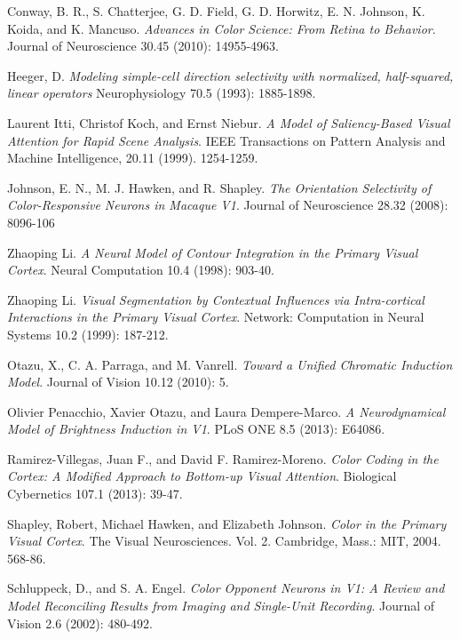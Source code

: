 \documentclass[journal,onecolumn]{IEEEtran}
\begin{document}
\begin{thebibliography}{1}

    Conway, B. R., S. Chatterjee, G. D. Field, G. D. Horwitz, E. N. Johnson, K. Koida, and K. Mancuso.
    \emph{Advances in Color Science: From Retina to Behavior}.
    Journal of Neuroscience 30.45 (2010): 14955-4963.

    Heeger, D.
    \emph{Modeling simple-cell direction selectivity with normalized, half-squared, linear operators}
    Neurophysiology 70.5 (1993): 1885-1898.

    Laurent Itti, Christof Koch, and Ernst Niebur.
    \emph{A Model of Saliency-Based Visual Attention for Rapid Scene Analysis}.
    IEEE Transactions on Pattern Analysis and Machine Intelligence, 20.11 (1999). 1254-1259.

    Johnson, E. N., M. J. Hawken, and R. Shapley.
    \emph{The Orientation Selectivity of Color-Responsive Neurons in Macaque V1}.
    Journal of Neuroscience 28.32 (2008): 8096-106

  Zhaoping Li.
  \emph{A Neural Model of Contour Integration in the Primary Visual Cortex}.
  Neural Computation 10.4 (1998): 903-40.

  Zhaoping Li.
  \emph{Visual Segmentation by Contextual Influences via Intra-cortical Interactions in the Primary Visual Cortex}.
  Network: Computation in Neural Systems 10.2 (1999): 187-212.

    Otazu, X., C. A. Parraga, and M. Vanrell.
    \emph{Toward a Unified Chromatic Induction Model}.
    Journal of Vision 10.12 (2010): 5.

    Olivier Penacchio, Xavier Otazu, and Laura Dempere-Marco.
    \emph{A Neurodynamical Model of Brightness Induction in V1}.
    PLoS ONE 8.5 (2013): E64086.

    Ramirez-Villegas, Juan F., and David F. Ramirez-Moreno.
    \emph{Color Coding in the Cortex: A Modified Approach to Bottom-up Visual Attention}.
    Biological Cybernetics 107.1 (2013): 39-47.

    Shapley, Robert, Michael Hawken, and Elizabeth Johnson.
    \emph{Color in the Primary Visual Cortex}.
    The Visual Neurosciences. Vol. 2.
    Cambridge, Mass.: MIT, 2004.
    568-86.

    Schluppeck, D., and S. A. Engel.
    \emph{Color Opponent Neurons in V1: A Review and Model Reconciling Results from Imaging and Single-Unit Recording}.
    Journal of Vision 2.6 (2002): 480-492.


\end{thebibliography}
\end{document}
